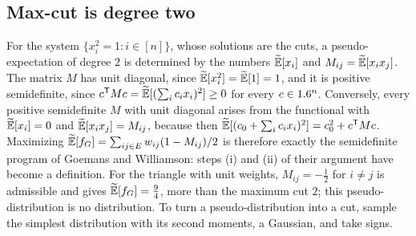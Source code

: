 \begin{refsection}
\subsection{Max-cut is degree two}\label{sec:sos:gw}

For the system $\{x_i^2=1:i\in[n]\}$, whose solutions are the cuts, a pseudo-expectation of degree $2$ is determined by the numbers $\widetilde{\mathbb{E}}[x_i]$ and $M_{ij}=\widetilde{\mathbb{E}}[x_ix_j]$. The matrix $M$ has unit diagonal, since $\widetilde{\mathbb{E}}[x_i^2]=\widetilde{\mathbb{E}}[1]=1$, and it is positive semidefinite, since $c^{\mathsf T}Mc=\widetilde{\mathbb{E}}[(\sum_ic_ix_i)^2]\ge0$ for every $c\in1.6^n$. Conversely, every positive semidefinite $M$ with unit diagonal arises from the functional with $\widetilde{\mathbb{E}}[x_i]=0$ and $\widetilde{\mathbb{E}}[x_ix_j]=M_{ij}$, because then $\widetilde{\mathbb{E}}[(c_0+\sum_ic_ix_i)^2]=c_0^2+c^{\mathsf T}Mc$. Maximizing $\widetilde{\mathbb{E}}[f_G]=\sum_{ij\in E}w_{ij}(1-M_{ij})/2$ is therefore exactly the semidefinite program of Goemans and Williamson: steps (i) and (ii) of their argument have become a definition. For the triangle with unit weights, $M_{ij}=-\frac12$ for $i\ne j$ is admissible and gives $\widetilde{\mathbb{E}}[f_G]=\frac94$, more than the maximum cut $2$; this pseudo-distribution is no distribution. To turn a pseudo-distribution into a cut, sample the simplest distribution with its second moments, a Gaussian, and take signs.



\end{refsection}
